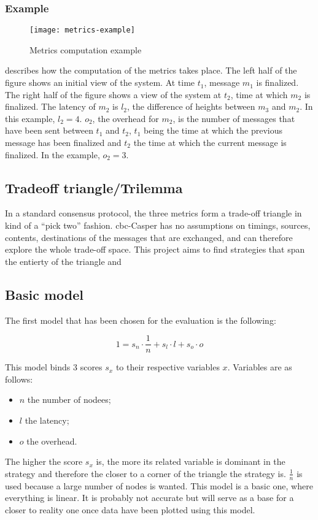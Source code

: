 \subsubsection{Example}

\begin{figure}[h]
	\centering
	\texttt{[image: metrics-example]}
  \captionsetup{justification=centering}
    \caption{Metrics computation example}
	\label{fig:metricsSchema}
\end{figure}

 describes how the computation of the metrics
takes place. The left half of the figure shows an initial view of the system. At
time \(t_1\), message \(m_1\) is finalized. The right half of the figure shows a
view of the system at \(t_2\), time at which \(m_2\) is finalized. The latency
of \(m_2\) is \(l_2\), the difference of heights between \(m_3\) and \(m_2\). In
this example, \(l_2 = 4\). \(o_2\), the overhead for \(m_2\), is the number of
messages that have been sent between \(t_1\) and \(t_2\), \(t_1\) being the time
at which the previous message has been finalized and \(t_2\) the time at which
the current message is finalized. In the example, \(o_2 = 3\).
\FloatBarrier

\subsection{Tradeoff triangle/Trilemma}
In a standard consensus protocol, the three metrics form a trade-off triangle in
kind of a ``pick two'' fashion.  \gls{cbc}-Casper has no
assumptions on timings, sources, contents, destinations of the messages that are
exchanged, and can therefore explore the whole trade-off space. This project
aims to find strategies that span the entierty of the triangle and 

\subsection{Basic model}
\label{ssec:model}
The first model that has been chosen for the evaluation is the following:

\[1 = s_n \cdot \frac{1}{n} + s_l\cdot l + s_o\cdot o\]

This model binds 3 scores \(s_x\) to their respective variables \(x\).
Variables are as follows:
\begin{itemize}
    \item \(n\) the number of nodees;
    \item \(l\) the latency;
    \item \(o\) the overhead.
\end{itemize}
The higher the score \(s_x\) is, the more its related variable is dominant
in the strategy and therefore the closer to a corner of the triangle the strategy is.
\(\frac{1}{n}\) is used because a large number of nodes is wanted.
This model is a basic one, where everything is linear. It is probably not accurate but
will serve as a base for a closer to reality one once data have been plotted using
this model.

